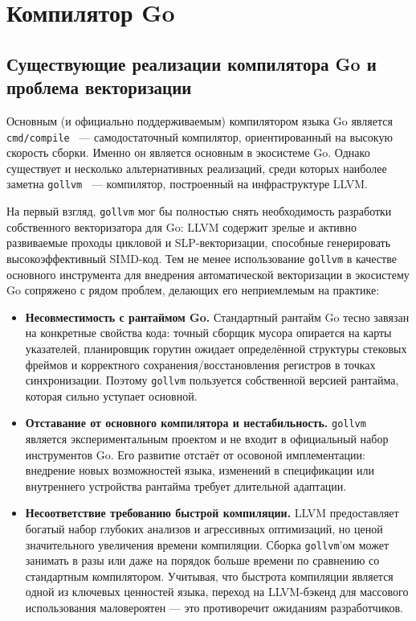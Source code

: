 \section{Компилятор Go}
\label{sec:Chapter4} 

\subsection{Существующие реализации компилятора Go и проблема векторизации}

Основным (и официально поддерживаемым) компилятором языка Go является \texttt{cmd/compile}~\cite{golang_compile_doc, golang_compile_readme}
 --- самодостаточный компилятор, ориентированный на высокую скорость сборки. 
 Именно он является основным в экосистеме Go. 
 Однако существует и несколько альтернативных реализаций,
 среди которых наиболее заметна \texttt{gollvm}~\cite{gollvm} --- компилятор, построенный на инфраструктуре LLVM.

На первый взгляд, \texttt{gollvm} мог бы полностью снять необходимость разработки собственного векторизатора для Go:
LLVM содержит зрелые и активно развиваемые проходы цикловой и SLP-векторизации,
способные генерировать высокоэффективный SIMD-код.
Тем не менее использование \texttt{gollvm} в качестве основного инструмента для внедрения автоматической векторизации
в экосистему Go сопряжено с рядом проблем, делающих его неприемлемым на практике:

\begin{itemize}
    \item \textbf{Несовместимость с рантаймом Go.} Стандартный рантайм Go тесно завязан на конкретные свойства кода: точный сборщик мусора опирается на карты указателей, планировщик горутин ожидает определённой структуры стековых фреймов и корректного сохранения/восстановления регистров в точках синхронизации. Поэтому \texttt{gollvm} пользуется собственной версией рантайма, которая сильно уступает основной.
    
    \item \textbf{Отставание от основного компилятора и нестабильность.} \texttt{gollvm} является экспериментальным проектом
    и не входит в официальный набор инструментов Go. 
    Его развитие отстаёт от осовоной имплементации: внедрение новых возможностей языка,
    изменений в спецификации или внутреннего устройства рантайма требует длительной адаптации.
    
    \item \textbf{Несоответствие требованию быстрой компиляции.} LLVM предоставляет богатый набор глубоких анализов и 
    агрессивных оптимизаций, но ценой значительного увеличения времени компиляции. 
    Сборка \texttt{gollvm}'ом может занимать в разы или даже на порядок больше времени по сравнению со стандартным компилятором. 
    Учитывая, что быстрота компиляции является одной из ключевых ценностей языка,
    переход на LLVM-бэкенд для массового использования маловероятен --- это противоречит ожиданиям разработчиков.
\end{itemize}

